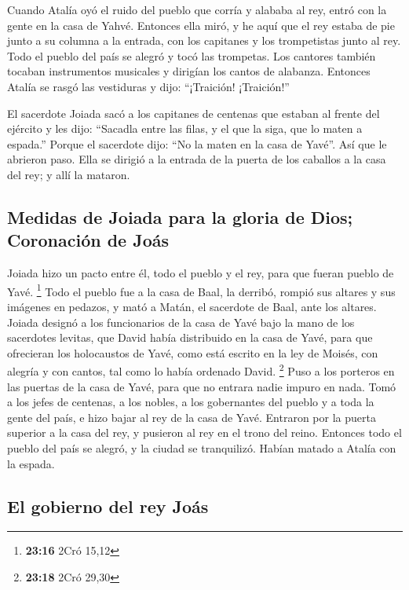  Cuando Atalía oyó el ruido del pueblo que corría y
alababa al rey, entró con la gente en la casa de Yahvé. 
Entonces ella miró, y he aquí que el rey estaba de pie junto a su
columna a la entrada, con los capitanes y los trompetistas junto al rey.
Todo el pueblo del país se alegró y tocó las trompetas. Los cantores
también tocaban instrumentos musicales y dirigían los cantos de
alabanza. Entonces Atalía se rasgó las vestiduras y dijo: ``¡Traición!
¡Traición!''

 El sacerdote Joiada sacó a los capitanes de centenas que
estaban al frente del ejército y les dijo: ``Sacadla entre las filas, y
el que la siga, que lo maten a espada.'' Porque el sacerdote dijo: ``No
la maten en la casa de Yavé''.  Así que le abrieron paso.
Ella se dirigió a la entrada de la puerta de los caballos a la casa del
rey; y allí la mataron.

\hypertarget{medidas-de-joiada-para-la-gloria-de-dios-coronaciuxf3n-de-jouxe1s}{%
\subsection{Medidas de Joiada para la gloria de Dios; Coronación de
Joás}\label{medidas-de-joiada-para-la-gloria-de-dios-coronaciuxf3n-de-jouxe1s}}

 Joiada hizo un pacto entre él, todo el pueblo y el rey,
para que fueran pueblo de Yavé. \footnote{\textbf{23:16} 2Cró 15,12}
 Todo el pueblo fue a la casa de Baal, la derribó, rompió
sus altares y sus imágenes en pedazos, y mató a Matán, el sacerdote de
Baal, ante los altares.  Joiada designó a los
funcionarios de la casa de Yavé bajo la mano de los sacerdotes levitas,
que David había distribuido en la casa de Yavé, para que ofrecieran los
holocaustos de Yavé, como está escrito en la ley de Moisés, con alegría
y con cantos, tal como lo había ordenado David. \footnote{\textbf{23:18}
  2Cró 29,30}  Puso a los porteros en las puertas de la
casa de Yavé, para que no entrara nadie impuro en nada. 
Tomó a los jefes de centenas, a los nobles, a los gobernantes del pueblo
y a toda la gente del país, e hizo bajar al rey de la casa de Yavé.
Entraron por la puerta superior a la casa del rey, y pusieron al rey en
el trono del reino.  Entonces todo el pueblo del país se
alegró, y la ciudad se tranquilizó. Habían matado a Atalía con la
espada.

\hypertarget{el-gobierno-del-rey-jouxe1s}{%
\subsection{El gobierno del rey
Joás}\label{el-gobierno-del-rey-jouxe1s}}

